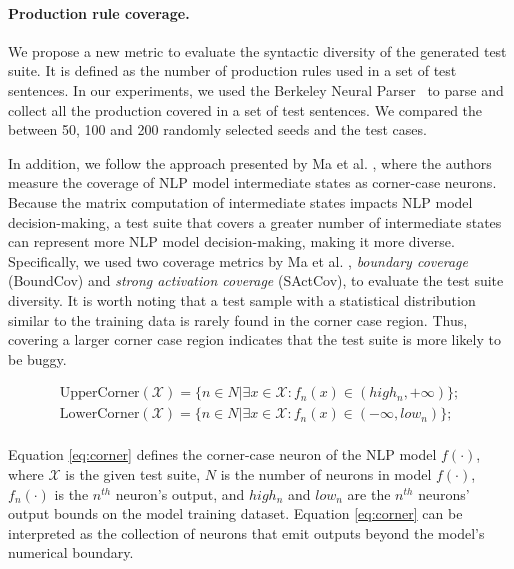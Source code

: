 \paragraph*{Production rule coverage.} We propose a new metric to evaluate the syntactic diversity of the generated test suite.
It is defined as the number of production rules used in a set of test sentences. In our experiments, we used the Berkeley Neural Parser~\cite{kitaev2018seedparser,kitaev2019seedparser} to parse and collect all the production covered in a set of test sentences.
We compared the \pdr between 50, 100 and 200 randomly selected \tool seeds and the \Cklst test cases.


In addition,
we follow the approach presented by Ma et al. \cite{ma2018deepgauge},
where the authors measure the coverage of NLP model intermediate states as corner-case neurons.
Because the matrix computation of intermediate states impacts NLP model decision-making, a test suite that covers a greater number of intermediate states can represent more NLP model decision-making, making it more diverse.
Specifically, we used two coverage metrics by Ma et al. \cite{ma2018deepgauge}, \textit{boundary coverage} (BoundCov) and \textit{strong activation coverage} (SActCov), to evaluate the test suite diversity.
It is worth noting that a test sample with a statistical distribution similar to the training data is rarely found in the corner case region.
Thus, covering a larger corner case region indicates that the test suite is more likely to be buggy.


\begin{equation}
\begin{split}
    \text{UpperCorner}(\mathcal{X}) = \{n \in N | \exists x \in \mathcal{X}: f_n(x) \in (high_n, +\infty)\}; \\
    \text{LowerCorner}(\mathcal{X}) = \{n \in N | \exists x \in \mathcal{X}: f_n(x) \in (-\infty, low_n)\}; \\
\end{split}
    \label{eq:corner}
\end{equation}

\noindent Equation \ref{eq:corner} defines the corner-case neuron of the NLP model $f(\cdot)$, where $\mathcal{X}$ is the given test suite, $N$ is the number of neurons in model $f(\cdot)$, $f_n(\cdot)$ is the $n^{th}$ neuron's output, and $high_n$ and $low_n$ are the $n^{th}$ neurons' output bounds on the model training dataset.
Equation \ref{eq:corner} can be interpreted as the collection of neurons that emit outputs beyond the model's numerical boundary.

